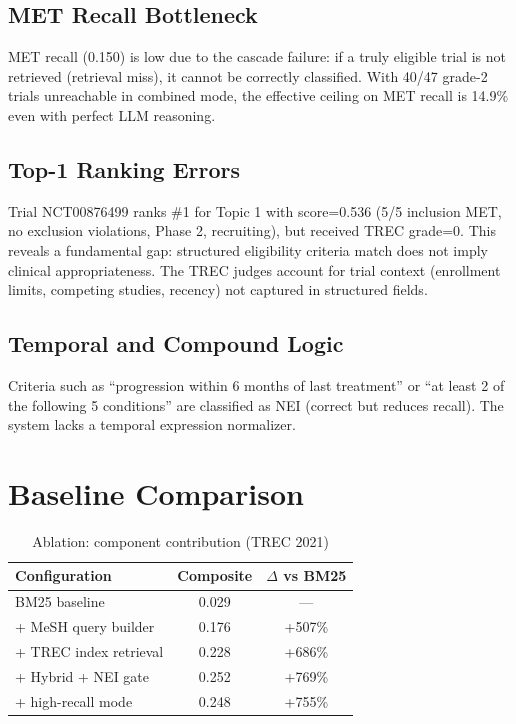 \documentclass[10pt,twocolumn]{article}
\begin{document}
\subsection{MET Recall Bottleneck}

MET recall (0.150) is low due to the cascade failure: if a truly eligible trial is
not retrieved (retrieval miss), it cannot be correctly classified. With 40/47 grade-2
trials unreachable in combined mode, the effective ceiling on MET recall is 14.9\%
even with perfect LLM reasoning.

\subsection{Top-1 Ranking Errors}

Trial NCT00876499 ranks \#1 for Topic 1 with score=0.536 (5/5 inclusion MET, no
exclusion violations, Phase 2, recruiting), but received TREC grade=0.
This reveals a fundamental gap: structured eligibility criteria match does not imply
clinical appropriateness. The TREC judges account for trial context (enrollment limits,
competing studies, recency) not captured in structured fields.

\subsection{Temporal and Compound Logic}

Criteria such as ``progression within 6 months of last treatment'' or ``at least 2 of
the following 5 conditions'' are classified as NEI (correct but reduces recall).
The system lacks a temporal expression normalizer.

\section{Baseline Comparison}

\begin{table}[H]
\centering
\caption{Ablation: component contribution (TREC 2021)}
\small
\begin{tabular}{lcc}
\toprule
\textbf{Configuration} & \textbf{Composite} & \textbf{$\Delta$ vs BM25} \\
\midrule
BM25 baseline & 0.029 & — \\
+ MeSH query builder & 0.176 & +507\% \\
+ TREC index retrieval & 0.228 & +686\% \\
+ Hybrid + NEI gate & 0.252 & +769\% \\
+ high-recall mode & 0.248 & +755\% \\
\bottomrule
\end{tabular}
\end{table}
\end{document}

